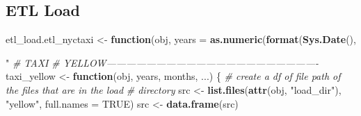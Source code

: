 \documentclass[12pt,twoside]{reedthesis}
\newenvironment{Shaded}{\begin{snugshade}}{\end{snugshade}}
\newcommand{\KeywordTok}[1]{\textcolor[rgb]{0.13,0.29,0.53}{\textbf{#1}}}
\newcommand{\DataTypeTok}[1]{\textcolor[rgb]{0.13,0.29,0.53}{#1}}
\newcommand{\DecValTok}[1]{\textcolor[rgb]{0.00,0.00,0.81}{#1}}
\newcommand{\StringTok}[1]{\textcolor[rgb]{0.31,0.60,0.02}{#1}}
\newcommand{\CommentTok}[1]{\textcolor[rgb]{0.56,0.35,0.01}{\textit{#1}}}
\newcommand{\OtherTok}[1]{\textcolor[rgb]{0.56,0.35,0.01}{#1}}
\newcommand{\ControlFlowTok}[1]{\textcolor[rgb]{0.13,0.29,0.53}{\textbf{#1}}}
\newcommand{\OperatorTok}[1]{\textcolor[rgb]{0.81,0.36,0.00}{\textbf{#1}}}
\newcommand{\NormalTok}[1]{#1}
\theoremstyle{definition}
\theoremstyle{definition}
\theoremstyle{definition}
\theoremstyle{remark}
\begin{document}
\subsection{ETL Load}\label{etl-load}
\begin{Shaded}
\begin{Highlighting}[]
\NormalTok{etl_load.etl_nyctaxi <-}\StringTok{ }\ControlFlowTok{function}\NormalTok{(obj, }\DataTypeTok{years =} \KeywordTok{as.numeric}\NormalTok{(}\KeywordTok{format}\NormalTok{(}\KeywordTok{Sys.Date}\NormalTok{(), }
    \StringTok{"%
    \CommentTok{# TAXI}
    \CommentTok{# YELLOW----------------------------------------------------------------}
\NormalTok{    taxi_yellow <-}\StringTok{ }\ControlFlowTok{function}\NormalTok{(obj, years, months, ...) \{}
        \CommentTok{# create a df of file path of the files that are in the load}
        \CommentTok{# directory}
\NormalTok{        src <-}\StringTok{ }\KeywordTok{list.files}\NormalTok{(}\KeywordTok{attr}\NormalTok{(obj, }\StringTok{"load_dir"}\NormalTok{), }\StringTok{"yellow"}\NormalTok{, }\DataTypeTok{full.names =} \OtherTok{TRUE}\NormalTok{)}
\NormalTok{        src <-}\StringTok{ }\KeywordTok{data.frame}\NormalTok{(src)}
        
}
\end{Highlighting}
\end{Shaded}
\end{document}

